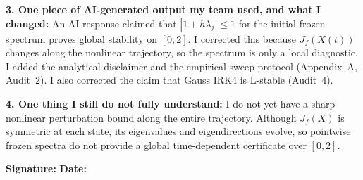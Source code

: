 \documentclass[10pt,a4paper]{article}
\begin{document}
\begin{formbox}
\textbf{3. One piece of AI-generated output my team used, and what I changed:}
An AI response claimed that $|1+h\lambda_j|\leq1$ for the initial frozen
spectrum proves global stability on $[0,2]$. I corrected this because
$J_f(X(t))$ changes along the nonlinear trajectory, so the spectrum is only a
local diagnostic. I added the analytical disclaimer and the empirical sweep
protocol (Appendix~A, Audit~2). I also corrected the claim that Gauss IRK4 is
L-stable (Audit~4).

\textbf{4. One thing I still do not fully understand:}
I do not yet have a sharp nonlinear perturbation bound along the entire
trajectory. Although $J_f(X)$ is symmetric at each state, its eigenvalues and
eigendirections evolve, so pointwise frozen spectra do not provide a global
time-dependent certificate over $[0,2]$.

\textbf{Signature:} \underline{\hspace{4.5cm}} \hfill
\textbf{Date:} \underline{\hspace{2.5cm}}
\end{formbox}
\end{document}
